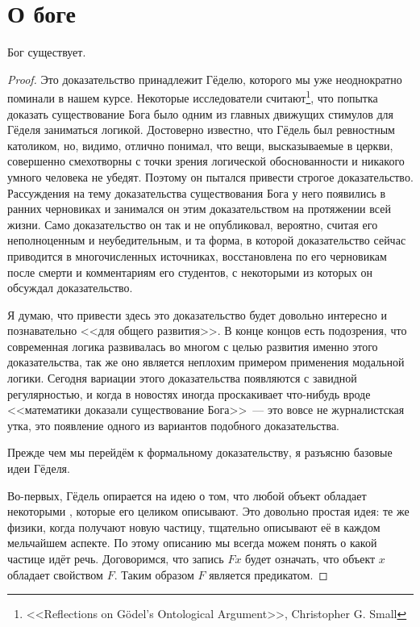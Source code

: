 \section{О боге}

\begin{thm}
Бог существует.
\end{thm}
\begin{proof}
Это доказательство принадлежит Гёделю, которого мы уже неоднократно поминали в нашем курсе. Некоторые исследователи считают\footnote{<<Reflections on Gödel’s Ontological Argument>>, Christopher G. Small}, что попытка доказать существование Бога было одним из главных движущих стимулов для Гёделя заниматься логикой. Достоверно известно, что Гёдель был ревностным католиком, но, видимо, отлично понимал, что вещи, высказываемые в церкви, совершенно смехотворны с точки зрения логической обоснованности и никакого умного человека не убедят. Поэтому он пытался привести строгое доказательство. Рассуждения на тему доказательства существования Бога у него появились в ранних черновиках и занимался он этим доказательством на протяжении всей жизни. Само доказательство он так и не опубликовал, вероятно, считая его неполноценным и неубедительным, и та форма, в которой доказательство сейчас приводится в многочисленных источниках, восстановлена по его черновикам после смерти и комментариям его студентов, с некоторыми из которых он обсуждал доказательство.

Я думаю, что привести здесь это доказательство будет довольно интересно и познавательно <<для общего развития>>. В конце концов есть подозрения, что современная логика развивалась во многом с целью развития именно этого доказательства, так же оно является неплохим примером применения модальной логики. Сегодня вариации этого доказательства появляются с завидной регулярностью, и когда в новостях иногда проскакивает что-нибудь вроде <<математики доказали существование Бога>>~--- это вовсе не журналистская утка, это появление одного из вариантов подобного доказательства.

Прежде чем мы перейдём к формальному доказательству, я разъясню базовые идеи Гёделя.

Во-первых, Гёдель опирается на идею о том, что любой объект обладает некоторыми , которые его целиком описывают. Это довольно простая идея: те же физики, когда получают новую частицу, тщательно описывают её в каждом мельчайшем аспекте. По этому описанию мы всегда можем понять о какой частице идёт речь. Договоримся, что запись $Fx$ будет означать, что объект $x$ обладает свойством $F$. Таким образом $F$ является предикатом.


\end{proof}
